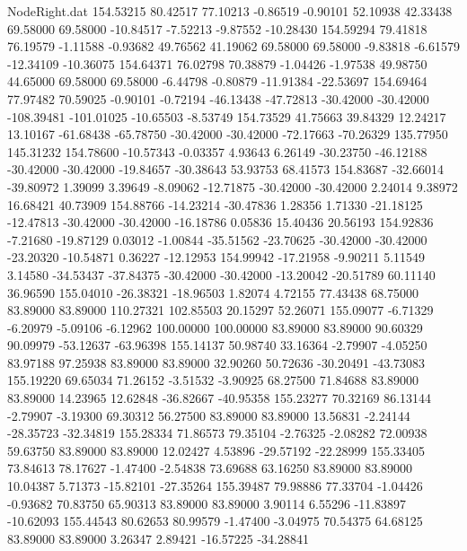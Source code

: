 \begin{filecontents}{NodeRight.dat}
 154.53215   80.42517   77.10213    -0.86519   -0.90101   52.10938   42.33438   69.58000   69.58000  -10.84517   -7.52213   -9.87552  -10.28430
 154.59294   79.41818   76.19579    -1.11588   -0.93682   49.76562   41.19062   69.58000   69.58000   -9.83818   -6.61579  -12.34109  -10.36075
 154.64371   76.02798   70.38879    -1.04426   -1.97538   49.98750   44.65000   69.58000   69.58000   -6.44798   -0.80879  -11.91384  -22.53697
 154.69464   77.97482   70.59025    -0.90101   -0.72194  -46.13438  -47.72813  -30.42000  -30.42000 -108.39481 -101.01025  -10.65503   -8.53749
 154.73529   41.75663   39.84329    12.24217   13.10167  -61.68438  -65.78750  -30.42000  -30.42000  -72.17663  -70.26329  135.77950  145.31232
 154.78600  -10.57343   -0.03357     4.93643    6.26149  -30.23750  -46.12188  -30.42000  -30.42000  -19.84657  -30.38643   53.93753   68.41573
 154.83687  -32.66014  -39.80972     1.39099    3.39649   -8.09062  -12.71875  -30.42000  -30.42000    2.24014    9.38972   16.68421   40.73909
 154.88766  -14.23214  -30.47836     1.28356    1.71330  -21.18125  -12.47813  -30.42000  -30.42000  -16.18786    0.05836   15.40436   20.56193
 154.92836   -7.21680  -19.87129     0.03012   -1.00844  -35.51562  -23.70625  -30.42000  -30.42000  -23.20320  -10.54871    0.36227  -12.12953
 154.99942  -17.21958   -9.90211     5.11549    3.14580  -34.53437  -37.84375  -30.42000  -30.42000  -13.20042  -20.51789   60.11140   36.96590
 155.04010  -26.38321  -18.96503     1.82074    4.72155   77.43438   68.75000   83.89000   83.89000  110.27321  102.85503   20.15297   52.26071
 155.09077   -6.71329   -6.20979    -5.09106   -6.12962  100.00000  100.00000   83.89000   83.89000   90.60329   90.09979  -53.12637  -63.96398
 155.14137   50.98740   33.16364    -2.79907   -4.05250   83.97188   97.25938   83.89000   83.89000   32.90260   50.72636  -30.20491  -43.73083
 155.19220   69.65034   71.26152    -3.51532   -3.90925   68.27500   71.84688   83.89000   83.89000   14.23965   12.62848  -36.82667  -40.95358
 155.23277   70.32169   86.13144    -2.79907   -3.19300   69.30312   56.27500   83.89000   83.89000   13.56831   -2.24144  -28.35723  -32.34819
 155.28334   71.86573   79.35104    -2.76325   -2.08282   72.00938   59.63750   83.89000   83.89000   12.02427    4.53896  -29.57192  -22.28999
 155.33405   73.84613   78.17627    -1.47400   -2.54838   73.69688   63.16250   83.89000   83.89000   10.04387    5.71373  -15.82101  -27.35264
 155.39487   79.98886   77.33704    -1.04426   -0.93682   70.83750   65.90313   83.89000   83.89000    3.90114    6.55296  -11.83897  -10.62093
 155.44543   80.62653   80.99579    -1.47400   -3.04975   70.54375   64.68125   83.89000   83.89000    3.26347    2.89421  -16.57225  -34.28841

\end{filecontents}
